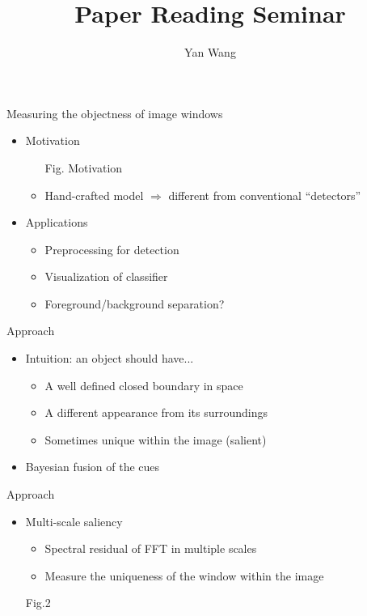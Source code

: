 \documentclass[12pt]{beamer}
\author{Yan Wang}
\title{Paper Reading Seminar}
\subtitle{}
\begin{document}
\begin{frame}[plain]
    \titlepage
\end{frame}

\begin{frame}{Measuring the objectness of image windows}
    \begin{itemize}
        \item Motivation
        \begin{itemize}
            \item [Fig. Motivation]
            \item Hand-crafted model $\Rightarrow$ different from conventional ``detectors''
        \end{itemize}
        \item Applications
        \begin{itemize}
            \item Preprocessing for detection
            \item Visualization of classifier
            \item Foreground/background separation?
        \end{itemize}
    \end{itemize}
\end{frame}

\begin{frame}{Approach}
    \begin{itemize}
        \item Intuition: an object should have...
        \begin{itemize}
            \item A well defined closed boundary in space
            \item A different appearance from its surroundings
            \item Sometimes unique within the image (salient)
        \end{itemize}
        \item Bayesian fusion of the cues
    \end{itemize}
\end{frame}

\begin{frame}{Approach}
    \begin{itemize}
        \item Multi-scale saliency
        \begin{itemize}
            \item Spectral residual of FFT in multiple scales
            \item Measure the uniqueness of the window within the image
        \end{itemize}
        \item [Fig.2]
    \end{itemize}
\end{frame}
\end{document}
